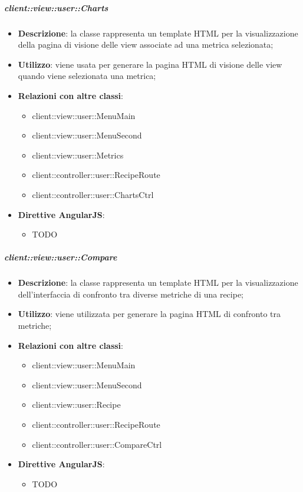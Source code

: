 		\subparagraph{client::view::user::Charts} %
		\label{subp:bdsm_app_client_view_user_charts}

			\begin{itemize}
				\item \textbf{Descrizione}: la classe rappresenta un template HTML per la visualizzazione della pagina di visione delle view associate ad una metrica selezionata;
				\item \textbf{Utilizzo}: viene usata per generare la pagina HTML di visione delle view quando viene selezionata una metrica;
				\item \textbf{Relazioni con altre classi}:
					\begin{itemize}
						\item client::view::user::MenuMain
						\item client::view::user::MenuSecond
						\item client::view::user::Metrics
						\item client::controller::user::RecipeRoute
						\item client::controller::user::ChartsCtrl
					\end{itemize}
				\item \textbf{Direttive AngularJS}:
					\begin{itemize}
						\item TODO
					\end{itemize}
			\end{itemize}

		\subparagraph{client::view::user::Compare} %
		\label{subp:bdsm_app_client_view_user_compare}

			\begin{itemize}
				\item \textbf{Descrizione}: la classe rappresenta un template HTML per la visualizzazione dell'interfaccia di confronto tra diverse metriche di una recipe;
				\item \textbf{Utilizzo}: viene utilizzata per generare la pagina HTML di confronto tra metriche;
				\item \textbf{Relazioni con altre classi}:
					\begin{itemize}
						\item client::view::user::MenuMain
						\item client::view::user::MenuSecond
						\item client::view::user::Recipe
						\item client::controller::user::RecipeRoute
						\item client::controller::user::CompareCtrl
					\end{itemize}
				\item \textbf{Direttive AngularJS}:
					\begin{itemize}
						\item TODO
					\end{itemize}
			\end{itemize}

